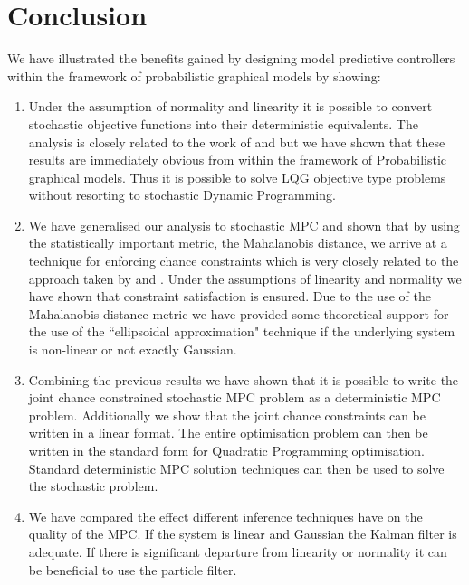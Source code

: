 \section{Conclusion}
We have illustrated the benefits gained by designing model predictive controllers within the framework of probabilistic graphical models by showing:
\begin{enumerate}
\item
Under the assumption of normality and linearity it is possible to convert stochastic objective functions into their deterministic equivalents. The analysis is closely related to the work of \cite{yan1} and \cite{yan2} but we have shown that these results are immediately obvious from within the framework of Probabilistic graphical models. Thus it is possible to solve LQG objective type problems without resorting to stochastic Dynamic Programming.
\item
We have generalised our analysis to stochastic MPC and shown that by using the statistically important metric, the Mahalanobis distance, we arrive at a technique for enforcing chance constraints which is very closely related to the approach taken by \cite{vanhessem2} and \cite{vanhessem1}. Under the assumptions of linearity and normality we have shown that constraint satisfaction is ensured. Due to the use of the Mahalanobis distance metric we have provided some theoretical support for the use of the ``ellipsoidal approximation" technique if the underlying system is non-linear or not exactly Gaussian.
\item
Combining the previous results we have shown that it is possible to write the joint chance constrained stochastic MPC problem as a deterministic MPC problem. Additionally we show that the joint chance constraints can be written in a linear format. The entire optimisation problem can then be written in the standard form for Quadratic Programming optimisation. Standard deterministic MPC solution techniques can then be used to solve the stochastic problem.
\item
We have compared the effect different inference techniques have on the quality of the MPC. If the system is linear and Gaussian the Kalman filter is adequate. If there is significant departure from linearity or normality it can be beneficial to use the particle filter.
\end{enumerate}